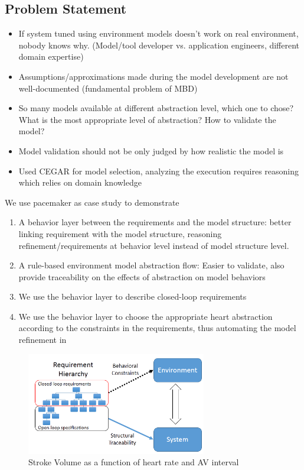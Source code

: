 \documentclass{llncs}
\begin{document}
\subsection{Problem Statement}
\begin{itemize}
	\item If system tuned using environment models doesn't work on real environment, nobody knows why. (Model/tool developer vs. application engineers, different domain expertise)
    \item Assumptions/approximations made during the model development are not well-documented (fundamental problem of MBD)
    \item So many models available at different abstraction level, which one to chose? What is the most appropriate level of abstraction? How to validate the model?
    \item Model validation should not be only judged by how realistic the model is
    \item Used CEGAR for model selection, analyzing the execution requires reasoning which relies on domain knowledge 
\end{itemize}
We use pacemaker as case study to demonstrate
\begin{enumerate}
	\item A behavior layer between the requirements and the model structure: better linking requirement with the model structure, reasoning refinement/requirements at behavior level instead of model structure level. 
    \item A rule-based environment model abstraction flow: Easier to validate, also provide traceability on the effects of abstraction on model behaviors
    \item We use the behavior layer to describe closed-loop requirements
    \item We use the behavior layer to choose the appropriate heart abstraction according to the constraints in the requirements, thus automating the model refinement in \cite{STTT13}
\end{enumerate}
\begin{figure}[!t]
		\centering
		\includegraphics[width=0.7\textwidth]{figs/requirement.png}
		\caption{\small Stroke Volume as a function of heart rate and AV interval}
		\label{fig:req}
\end{figure}
\end{document}
